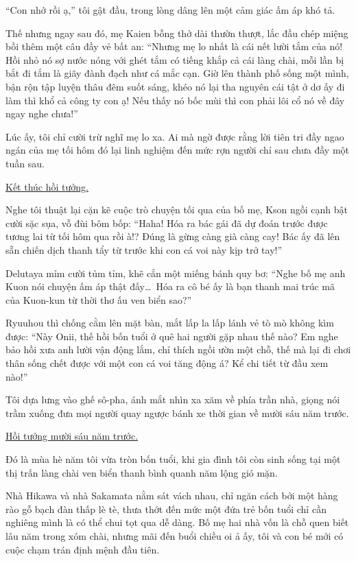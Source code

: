\documentclass[../main.tex]{subfiles}
\begin{document}
``Con nhớ rồi ạ,'' tôi gật đầu, trong lòng dâng lên một cảm giác ấm áp khó tả.

Thế nhưng ngay sau đó, mẹ Kaien bỗng thở dài thườn thượt, lắc đầu chép miệng bồi thêm một câu đầy vẻ bất an: ``Nhưng mẹ lo nhất là cái nết lười tắm của nó! Hồi nhỏ nó sợ nước nóng với ghét tắm có tiếng khắp cả cái làng chài, mỗi lần bị bắt đi tắm là giãy đành đạch như cá mắc cạn. Giờ lên thành phố sống một mình, bận rộn tập luyện thâu đêm suốt sáng, khéo nó lại tha nguyên cái tật ở dơ ấy đi làm thì khổ cả công ty con ạ! Nếu thấy nó bốc mùi thì con phải lôi cổ nó về đây ngay nghe chưa!''

Lúc ấy, tôi chỉ cười trừ nghĩ mẹ lo xa. Ai mà ngờ được rằng lời tiên tri đầy ngao ngán của mẹ tối hôm đó lại linh nghiệm đến mức rợn người chỉ sau chưa đầy một tuần sau.

\begin{center}
    \uline{Kết thúc hồi tưởng.}
\end{center}

Nghe tôi thuật lại cặn kẽ cuộc trò chuyện tối qua của bố mẹ, Kson ngồi cạnh bật cười sặc sụa, vỗ đùi bôm bốp: ``Haha! Hóa ra bác gái đã dự đoán trước được tương lai từ tối hôm qua rồi à!? Đúng là gừng càng già càng cay! Bác ấy đã lên sẵn chiến dịch thanh tẩy từ trước khi con cá voi này kịp trở tay!''

Delutaya mỉm cười tủm tỉm, khẽ cắn một miếng bánh quy bơ: ``Nghe bố mẹ anh Kuon nói chuyện ấm áp thật đấy\dots\ Hóa ra cô bé ấy là bạn thanh mai trúc mã của Kuon-kun từ thời thơ ấu ven biển sao?''

Ryuuhou thì chống cằm lên mặt bàn, mắt lấp la lấp lánh vẻ tò mò không kìm được: ``Này Onii, thế hồi bốn tuổi ở quê hai người gặp nhau thế nào? Em nghe bảo hồi xưa anh lười vận động lắm, chỉ thích ngồi ườn một chỗ, thế mà lại đi chơi thân sống chết được với một con cá voi tăng động á? Kể chi tiết từ đầu xem nào!''

Tôi dựa lưng vào ghế sô-pha, ánh mắt nhìn xa xăm về phía trần nhà, giọng nói trầm xuống đưa mọi người quay ngược bánh xe thời gian về mười sáu năm trước.

\begin{center}
    \uline{Hồi tưởng mười sáu năm trước.}
\end{center}

Đó là mùa hè năm tôi vừa tròn bốn tuổi, khi gia đình tôi còn sinh sống tại một thị trấn làng chài ven biển thanh bình quanh năm lộng gió mặn.

Nhà Hikawa và nhà Sakamata nằm sát vách nhau, chỉ ngăn cách bởi một hàng rào gỗ bạch đàn thấp lè tè, thưa thớt đến mức một đứa trẻ bốn tuổi chỉ cần nghiêng mình là có thể chui tọt qua dễ dàng. Bố mẹ hai nhà vốn là chỗ quen biết lâu năm trong xóm chài, nhưng mãi đến buổi chiều oi ả ấy, tôi và con bé mới có cuộc chạm trán định mệnh đầu tiên.
\end{document}
